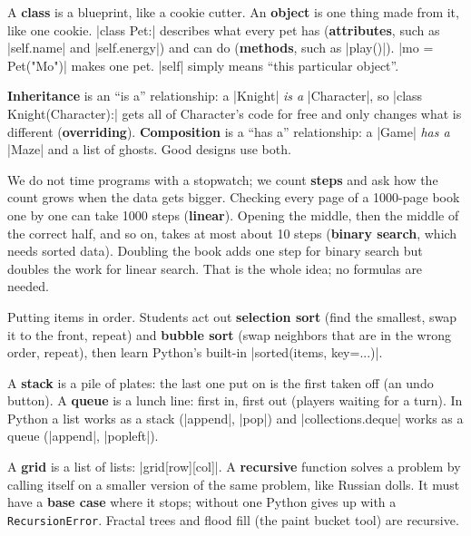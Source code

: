 \documentclass[level=3,teacher]{kidscode}
\begin{document}
\begin{description}[leftmargin=0pt,itemsep=6pt,font=\bfseries]
\item[Class and object (weeks 2--3).] A \textbf{class} is a blueprint, like a cookie cutter. An
\textbf{object} is one thing made from it, like one cookie. \py|class Pet:| describes what every
pet has (\textbf{attributes}, such as \py|self.name| and \py|self.energy|) and can do
(\textbf{methods}, such as \py|play()|). \py|mo = Pet("Mo")| makes one pet. \py|self| simply
means \enquote{this particular object}.

\item[Inheritance and composition (week 3).] \textbf{Inheritance} is an \enquote{is a}
relationship: a \py|Knight| \emph{is a} \py|Character|, so \py|class Knight(Character):| gets all
of Character's code for free and only changes what is different (\textbf{overriding}).
\textbf{Composition} is a \enquote{has a} relationship: a \py|Game| \emph{has a} \py|Maze| and a
list of ghosts. Good designs use both.

\item[Big-O intuition: \enquote{how fast is fast?} (weeks 4--5).] We do not time programs with a
stopwatch; we count \textbf{steps} and ask how the count grows when the data gets bigger.
Checking every page of a 1000-page book one by one can take 1000 steps (\textbf{linear}). Opening
the middle, then the middle of the correct half, and so on, takes at most about 10 steps
(\textbf{binary search}, which needs sorted data). Doubling the book adds one step for binary
search but doubles the work for linear search. That is the whole idea; no formulas are needed.

\item[Sorting (week 5).] Putting items in order. Students act out \textbf{selection sort} (find the
smallest, swap it to the front, repeat) and \textbf{bubble sort} (swap neighbors that are in the
wrong order, repeat), then learn Python's built-in \py|sorted(items, key=...)|.

\item[Stack and queue (week 5).] A \textbf{stack} is a pile of plates: the last one put on is the
first taken off (an undo button). A \textbf{queue} is a lunch line: first in, first out (players
waiting for a turn). In Python a list works as a stack (\py|append|, \py|pop|) and
\py|collections.deque| works as a queue (\py|append|, \py|popleft|).

\item[Grid and recursion (week 7).] A \textbf{grid} is a list of lists: \py|grid[row][col]|. A
\textbf{recursive} function solves a problem by calling itself on a smaller version of the same
problem, like Russian dolls. It must have a \textbf{base case} where it stops; without one Python
gives up with a \texttt{RecursionError}. Fractal trees and flood fill (the paint bucket tool) are
recursive.


\end{description}
\end{document}
